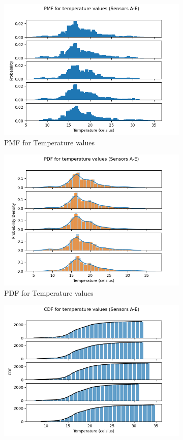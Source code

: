 \documentclass[a4paper,12pt]{article} %
\begin{document}
\begin{figure}[H] %
	\centering %
	\begin{subfigure}[b]{0.4\linewidth}
		\includegraphics[width=0.9\linewidth]{Figure_7.png} 
		\caption{PMF for Temperature values}
	\end{subfigure}
	\begin{subfigure}[b]{0.4\linewidth}
		\includegraphics[width=0.9\linewidth]{Figure_8.png} 
		\caption{PDF for Temperature values}
	\end{subfigure}
	\begin{subfigure}[b]{0.4\linewidth}
		\includegraphics[width=0.9\linewidth]{Figure_9.png} 

\end{subfigure}
\end{figure}
\end{document}
